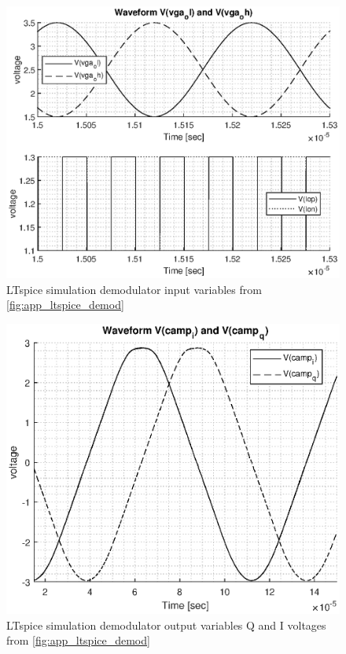 \begin{figure}[htbp]
	\centering
	\includegraphics[width=.8\textwidth]{Figures/3_demod_sim_in.eps}
	\caption{LTspice simulation demodulator input variables from \cref{fig:app_ltspice_demod}}
	\label{fig:3_demod_sim_in}
\end{figure}
\begin{figure}[htbp]
	\centering
	\includegraphics[width=.8\textwidth]{Figures/3_demod_sim_out.eps}
	\caption{LTspice simulation demodulator output variables Q and I voltages from \cref{fig:app_ltspice_demod}}
	\label{fig:3_demod_sim_out}
\end{figure}
